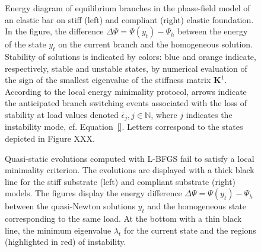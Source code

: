 \begin{figure}[htbp]
    \centering
    \caption{
        Energy diagram of equilibrium branches in the phase-field model of an elastic bar on stiff (left) and compliant (right) elastic foundation. In the figure, the difference $\Delta \Psi = \Psi(y_t)-\Psi_h$ between the energy of the state $y_t$ on the current branch and the homogeneous solution. Stability of solutions is indicated by colors: blue and orange indicate, respectively, stable and unstable states, by numerical evaluation of the sign of the smallest eigenvalue of the stiffness matrix $\mathbf{K}^1$. According to the local energy minimality protocol, arrows indicate the anticipated branch switching events associated with the loss of stability at load values denoted $\bar \epsilon_j, j \in \mathbb N$, where $j$ indicates the instability mode, cf. Equation~\eqref{}. Letters correspond to the states depicted in Figure XXX.%
    }
    \label{fig:}
\end{figure}

\begin{figure}[htbp]
    \centering
    \caption{Quasi-static evolutions computed with L-BFGS fail to satisfy a local minimality criterion. The evolutions are displayed with a thick black line for the stiff substrate (left) and compliant substrate (right) models. The figures display the energy difference $\Delta \Psi = \Psi(y_t)-\Psi_h$ between the quasi-Newton solutions $y_t$ and the homogeneous state corresponding to the same load. At the bottom with a thin black line, the minimum eigenvalue $\lambda_t$ for the current state and the regions (highlighted in red) of instability.}
    \label{fig:}
\end{figure}


